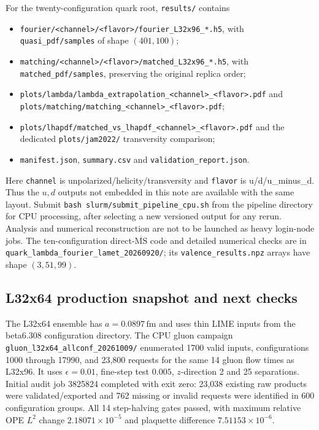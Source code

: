\documentclass[11pt]{article}
\numberwithin{equation}{section}
\newcommand{\MSbar}{\overline{\mathrm{MS}}}
\begin{document}
For the twenty-configuration quark root, \texttt{results/} contains
\begin{itemize}
 \item \nolinkurl{fourier/<channel>/<flavor>/fourier_L32x96_*.h5},
 with \texttt{quasi\_pdf/samples} of shape \((401,100)\);
 \item \nolinkurl{matching/<channel>/<flavor>/matched_L32x96_*.h5},
 with \texttt{matched\_pdf/samples}, preserving the original replica order;
 \item \nolinkurl{plots/lambda/lambda_extrapolation_<channel>_<flavor>.pdf}
 and \nolinkurl{plots/matching/matching_<channel>_<flavor>.pdf};
 \item \nolinkurl{plots/lhapdf/matched_vs_lhapdf_<channel>_<flavor>.pdf}
 and the dedicated \nolinkurl{plots/jam2022/} transversity comparison;
 \item \nolinkurl{manifest.json}, \nolinkurl{summary.csv} and
 \nolinkurl{validation_report.json}.
\end{itemize}
Here \texttt{channel} is unpolarized/helicity/transversity and
\texttt{flavor} is u/d/u\_minus\_d. Thus the \(u,d\) outputs not embedded
in this note are available with the same layout.
Submit \texttt{bash slurm/submit\_pipeline\_cpu.sh} from the pipeline
directory for CPU processing, after selecting a new versioned output
for any rerun. Analysis and numerical reconstruction are not to be
launched as heavy login-node jobs.
The ten-configuration direct-\(\MSbar\) code and detailed numerical
checks are in \nolinkurl{quark_lambda_fourier_lamet_20260920/};
its \texttt{valence\_results.npz} arrays have shape \((3,51,99)\).

\subsection{L32x64 production snapshot and next checks}

The L32x64 ensemble has \(a=0.0897\,\mathrm{fm}\) and uses thin LIME
inputs from the beta6.308 configuration directory.
The CPU gluon campaign
\nolinkurl{gluon_l32x64_allconf_20261009/} enumerated 1700 valid inputs,
configurations 1000 through 17990, and 23,800 requests for the same
14 gluon flow times as L32x96. It uses \(\epsilon=0.01\),
fine-step test \(0.005\), \(z\)-direction 2 and 25 separations.
Initial audit job 3825824 completed with exit zero:
23,038 existing raw products were validated/exported and 762 missing
or invalid requests were identified in 600 configuration groups.
All 14 step-halving gates passed, with maximum relative OPE \(L^2\)
change \(2.18071\times10^{-5}\) and plaquette difference
\(7.51153\times10^{-6}\).
\end{document}
